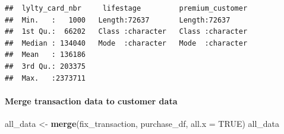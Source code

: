 \documentclass[
]{article}
\newenvironment{Shaded}{\begin{snugshade}}{\end{snugshade}}
\newcommand{\AttributeTok}[1]{\textcolor[rgb]{0.13,0.29,0.53}{#1}}
\newcommand{\ConstantTok}[1]{\textcolor[rgb]{0.56,0.35,0.01}{#1}}
\newcommand{\FunctionTok}[1]{\textcolor[rgb]{0.13,0.29,0.53}{\textbf{#1}}}
\newcommand{\NormalTok}[1]{#1}
\newcommand{\OtherTok}[1]{\textcolor[rgb]{0.56,0.35,0.01}{#1}}
\begin{document}
\begin{verbatim}
##  lylty_card_nbr     lifestage         premium_customer  
##  Min.   :   1000   Length:72637       Length:72637      
##  1st Qu.:  66202   Class :character   Class :character  
##  Median : 134040   Mode  :character   Mode  :character  
##  Mean   : 136186                                        
##  3rd Qu.: 203375                                        
##  Max.   :2373711
\end{verbatim}

\hypertarget{merge-transaction-data-to-customer-data}{%
\paragraph{Merge transaction data to customer
data}\label{merge-transaction-data-to-customer-data}}

\begin{Shaded}
\begin{Highlighting}[]
\NormalTok{all\_data }\OtherTok{\textless{}{-}} \FunctionTok{merge}\NormalTok{(fix\_transaction, purchase\_df, }\AttributeTok{all.x =} \ConstantTok{TRUE}\NormalTok{)}
\NormalTok{all\_data}
\end{Highlighting}
\end{Shaded}
\end{document}
